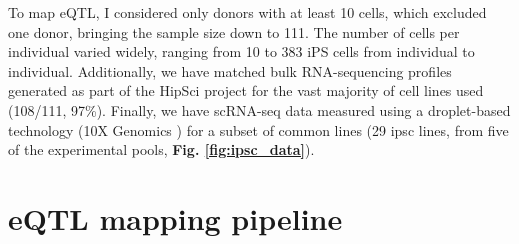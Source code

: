 To map eQTL, I considered only donors with at least 10 cells, which excluded one donor, bringing the sample size down to 111.
The number of cells per individual varied widely, ranging from 10 to 383 iPS cells from individual to individual.
Additionally, we have matched bulk RNA-sequencing profiles generated as part of the HipSci project \cite{kilpinen2017common} for the vast majority of cell lines used (108/111, 97\%). 
Finally, we have scRNA-seq data measured using a droplet-based technology (10X Genomics \cite{zheng2017massively}) for a subset of common lines (29 \gls{ipsc} lines, from five of the experimental pools, \textbf{Fig. \ref{fig:ipsc_data}}). 



\section{eQTL mapping pipeline}

